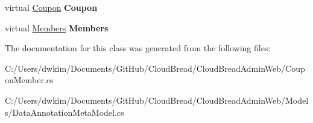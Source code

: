 \begin{DoxyCompactItemize}
\item 
virtual \hyperlink{class_cloud_bread_admin_web_1_1_coupon}{Coupon} {\bfseries Coupon}\hypertarget{class_cloud_bread_admin_web_1_1_coupon_member_ade32f4d6b2f399031de304dec97816f6}{}\label{class_cloud_bread_admin_web_1_1_coupon_member_ade32f4d6b2f399031de304dec97816f6}

\item 
virtual \hyperlink{class_cloud_bread_admin_web_1_1_members}{Members} {\bfseries Members}\hypertarget{class_cloud_bread_admin_web_1_1_coupon_member_a3806e7f3eee773d2e0e2b02e46cae9cc}{}\label{class_cloud_bread_admin_web_1_1_coupon_member_a3806e7f3eee773d2e0e2b02e46cae9cc}

\end{DoxyCompactItemize}


The documentation for this class was generated from the following files\+:\begin{DoxyCompactItemize}
\item 
C\+:/\+Users/dwkim/\+Documents/\+Git\+Hub/\+Cloud\+Bread/\+Cloud\+Bread\+Admin\+Web/Coupon\+Member.\+cs\item 
C\+:/\+Users/dwkim/\+Documents/\+Git\+Hub/\+Cloud\+Bread/\+Cloud\+Bread\+Admin\+Web/\+Models/Data\+Annotation\+Meta\+Model.\+cs\end{DoxyCompactItemize}
